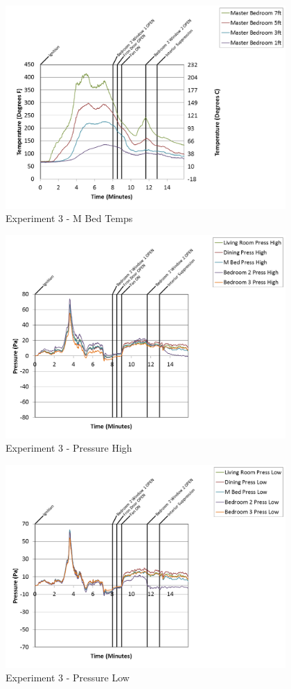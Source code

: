 \documentclass{article}
\begin{document}
\begin{appendices}
\clearpage

\begin{figure}[h!]
	\centering
	\includegraphics[height=3.05in]{0_Images/Results_Charts/Exp_3_Charts/MBedTemps.png}
	\caption{Experiment 3 - M Bed Temps}
\end{figure}


\begin{figure}[h!]
	\centering
	\includegraphics[height=3.05in]{0_Images/Results_Charts/Exp_3_Charts/PressureHigh.png}
	\caption{Experiment 3 - Pressure High}
\end{figure}

\clearpage

\begin{figure}[h!]
	\centering
	\includegraphics[height=3.05in]{0_Images/Results_Charts/Exp_3_Charts/PressureLow.png}
	\caption{Experiment 3 - Pressure Low}
\end{figure}



\end{appendices}
\end{document}
